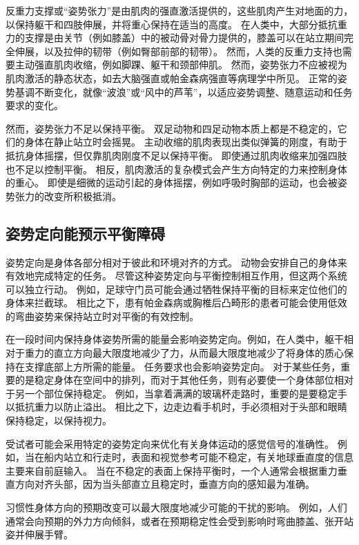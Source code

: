 反重力支撑或“姿势张力”是由肌肉的强直激活提供的，这些肌肉产生对地面的力，以保持躯干和四肢伸展，并将重心保持在适当的高度。
在人类中，大部分抵抗重力的支撑是由关节（例如膝盖）中的被动骨对骨力提供的，膝盖可以在站立期间完全伸展，以及拉伸的韧带（例如臀部前部的韧带）。
然而，人类的反重力支持也需要主动强直肌肉收缩，例如脚踝、躯干和颈部伸肌。
然而，姿势张力不应被视为肌肉激活的静态状态，如去大脑强直或帕金森病强直等病理学中所见。
正常的姿势基调不断变化，就像“波浪”或“风中的芦苇”，以适应姿势调整、随意运动和任务要求的变化。


然而，姿势张力不足以保持平衡。
双足动物和四足动物本质上都是不稳定的，它们的身体在静止站立时会摇晃。
主动收缩的肌肉表现出类似弹簧的刚度，有助于抵抗身体摇摆，但仅靠肌肉刚度不足以保持平衡。
即使通过肌肉收缩来加强四肢也不足以控制平衡。
相反，肌肉激活的复杂模式会产生方向特定的力来控制身体的重心。
即使是细微的运动引起的身体摇摆，例如呼吸时胸部的运动，也会被姿势张力的改变所积极抵消。



\subsection{姿势定向能预示平衡障碍}

姿势定向是身体各部分相对于彼此和环境对齐的方式。 动物会安排自己的身体来有效地完成特定的任务。
尽管这种姿势定向与平衡控制相互作用，但这两个系统可以独立行动。
例如，足球守门员可能会通过牺牲保持平衡的目标来定位他们的身体来拦截球。
相比之下，患有帕金森病或胸椎后凸畸形的患者可能会使用低效的弯曲姿势来保持站立时对平衡的有效控制。


在一段时间内保持身体姿势所需的能量会影响姿势定向。例如，在人类中，躯干相对于重力的直立方向最大限度地减少了力，从而最大限度地减少了将身体的质心保持在支撑底部上方所需的能量。
任务要求也会影响姿势定向。
对于某些任务，重要的是稳定身体在空间中的排列，而对于其他任务，则有必要使一个身体部位相对于另一个部位保持稳定。
例如，当拿着满满的玻璃杯走路时，重要的是要稳定手以抵抗重力以防止溢出。
相比之下，边走边看手机时，手必须相对于头部和眼睛保持稳定，以保持视力。


受试者可能会采用特定的姿势定向来优化有关身体运动的感觉信号的准确性。
例如，当在船内站立和行走时，表面和视觉参考可能不稳定，有关地球垂直度的信息主要来自前庭输入。
当在不稳定的表面上保持平衡时，一个人通常会根据重力垂直方向对齐头部，因为当头部直立且稳定时，垂直方向的感知最为准确。


习惯性身体方向的预期改变可以最大限度地减少可能的干扰的影响。
例如，人们通常会向预期的外力方向倾斜，或者在预期稳定性会受到影响时弯曲膝盖、张开站姿并伸展手臂。



